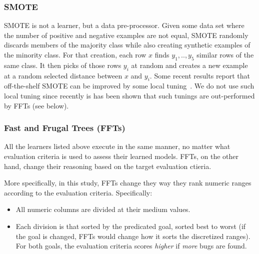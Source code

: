 \documentclass[10pt,journal,compsoc]{IEEEtran}
\newcommand{\bi}{\begin{itemize}[leftmargin=0.4cm]}
\newcommand{\ei}{\end{itemize}}
\begin{document}
\subsubsection{SMOTE}
        SMOTE is not a learner, but a data pre-processor.
        Given some data set where the number of positive and negative examples are not equal, SMOTE randomly discards members of the majority class while also creating synthetic examples of the minority class.
        For that creation, each row $x$ finds $y_1,..,y_5$ similar rows
        of the same class. It then picks of those rows 
        $y_i$ at random
        and creates a new example at a random selected distance between $x$ and $y_i$.  Some recent results report that off-the-shelf SMOTE can be improved by some local tuning~\cite{agrawal2018better,bennin2018mahakil}.
We do not use such local tuning since recently is has been shown that such tunings
are out-performed by FFTs (see below).

\subsubsection{Fast and Frugal Trees (FFTs)}
 All the   learners listed above execute in the same
        manner, no matter what   evaluation criteria  is used to assess their learned models.
        FFTs, on the other hand, change their reasoning based
        on the target evaluation ctieria. 
        
        More specifically, in this study,
        FFTs change  they way they rank numeric ranges according to the evaluation criteria. 
Specifically:
\bi
\item All numeric columns are divided at their medium values.
\item Each division is that  sorted by the predicated goal, sorted best to worst (if the goal is changed, FFTs would change how it sorts the  discretized ranges).  For both goals, the evaluation criteria scores {\em higher} if {\em more} bugs are found.
\ei
\end{document}
